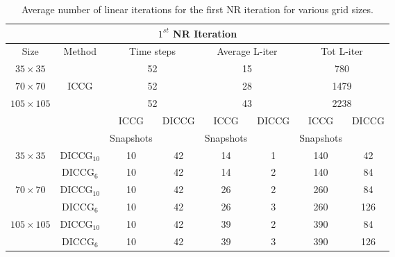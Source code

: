 \documentclass[12pt]{article}
\begin{document}
\begin{table}[!h]\centering
\begin{minipage}{1\textwidth}
\vspace{-10pt}
\centering
\begin{tabular}{ |c|c|c|c|c|c|c|c|} 
  \hline
\multicolumn{8}{|c|}{$1^{st}$ NR Iteration}  \\
\hline
Size&Method&  \multicolumn{2}{c|}{Time steps} &\multicolumn{2}{c|}{Average L-iter} & \multicolumn{2}{c|}{Tot L-iter}\\
\hline
$35\times35$& &\multicolumn{2}{c|}{52} & \multicolumn{2}{c|}{15}& \multicolumn{2}{c|}{780} \\

$70\times70$&ICCG&\multicolumn{2}{c|}{52}& \multicolumn{2}{c|}{28}& \multicolumn{2}{c|}{1479}\\

$105\times105$& & \multicolumn{2}{c|}{52} &\multicolumn{2}{c|}{43} & \multicolumn{2}{c|}{2238}\\
\hline
&&ICCG&DICCG&ICCG&DICCG&ICCG&DICCG\\
&&Snapshots&&Snapshots&&Snapshots&\\
\hline
$35\times35$&DICCG$_{10}$&10&42&14&1&140&42 \\
&DICCG$_6$&10&42&14&2&140&84 \\
\hline
$70\times70$&DICCG$_{10}$ &10&42 &26&2&260&84 \\
&DICCG$_6$ &10&42&26&3&260&126\\
\hline
$105\times105$&DICCG$_{10}$ &10&42 &39&2&390&84 \\
&DICCG$_6$&10&42&39&3&390&126 \\
\hline
 \end{tabular}
\caption{Average number of linear iterations for the first NR iteration for various grid sizes. }\label{table:liters1}
\end{minipage}
\end{table}
\end{document}
